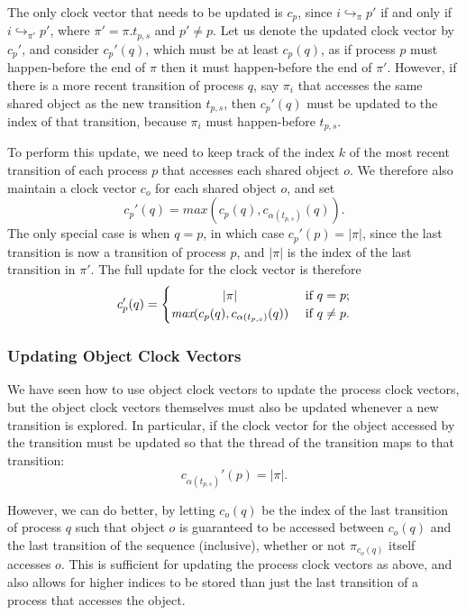\documentclass[12pt,a4paper,twoside,openright]{report}
\begin{document}
The only clock vector that needs to be updated
is $c_p$, since $i \hookrightarrow_\pi p'$ if
and only if $i \hookrightarrow_{\pi'} p'$,
where $\pi' = \pi.t_{p,s}$ and $p' \neq p$.
Let us denote the updated clock vector
by $c_p'$, and consider $c_p'(q)$, which
must be at least $c_p(q)$, as if process
$p$ must happen-before the end of $\pi$
then it must happen-before the end of $\pi'$.
However, if there is a more recent transition
of process $q$, say $\pi_i$
that accesses the same shared
object as the new transition $t_{p,s}$, then
$c_p'(q)$ must be updated to the index of
that transition, because $\pi_i$ must
happen-before $t_{p,s}$.

To perform this update, we need to keep
track of the index $k$ of the most recent
transition of each process $p$ that
accesses each shared object $o$. We therefore
also maintain a clock vector $c_o$ for each
shared object $o$, and set
\[ c_p'(q) =\textit{max}(c_p(q),
		c_{\alpha(t_{p,s})}(q)).\]
The only special case is when $q = p$,
in which case $c_p'(p) = |\pi|$, since
the last transition is now a transition of
process $p$, and $|\pi|$ is the index
of the last transition in $\pi'$. The
full update for the clock vector is therefore
\[ c_p'(q) =
\begin{cases}
	\hfill |\pi| \hfill & \text{ if } q = p; \\
	\hfill \textit{max}(c_p(q),
		c_{\alpha(t_{p,s})}(q))
		\hfill & \text{ if } q \neq p.
\end{cases}\]


\subsubsection{Updating Object Clock Vectors}

We have seen how to use object clock vectors to
update the process clock vectors, but
the object clock vectors themselves must also be
updated whenever a new transition is explored.
In particular, if the clock vector for the
object accessed by the transition must be
updated so that the thread of the transition
maps to that transition:
\[c_{\alpha(t_{p,s})}'(p) = |\pi|.\]

However, we can do better, by letting
$c_o(q)$ be the index of the
last transition of process
$q$ such that object $o$ is guaranteed to be
accessed between $c_o(q)$ and the last
transition of the sequence (inclusive),
whether or not $\pi_{c_o(q)}$ itself
accesses $o$.
This is sufficient for updating the
process clock vectors as above, and
also allows for higher indices to
be stored than just the last
transition of a process that
accesses the object.
\end{document}
